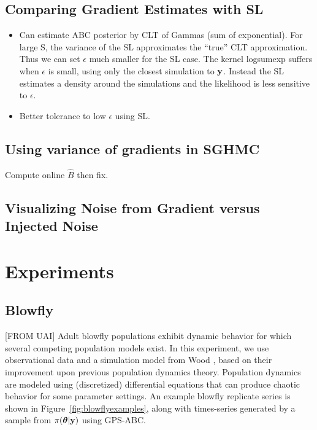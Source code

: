 \documentclass[]{article}
\begin{document}
\subsection{Comparing Gradient Estimates with SL}
\begin{itemize}
  \item Can estimate ABC posterior by CLT of Gammas (sum of exponential).  For large S, the variance of the SL approximates the ``true'' CLT approximation.  Thus we can set $\epsilon$ much smaller for the SL case.  The kernel logsumexp suffers when $\epsilon$ is small, using only the closest simulation to ${\bf y}$.  Instead the SL estimates a density around the simulations and the likelihood is less sensitive to $\epsilon$.
  \item Better tolerance to low $\epsilon$ using SL.
\end{itemize}

\subsection{Using variance of gradients in SGHMC}
Compute online $\hat{B}$ then fix.

\subsection{Visualizing Noise from Gradient versus Injected Noise}

\section{Experiments}\label{sec:experiments}

\subsection{Blowfly}\label{sec:bf}
[FROM UAI] Adult blowfly populations exhibit dynamic behavior for which several competing population models exist.  In this experiment, we use observational data and a simulation model from Wood \cite{wood2010statistical}, based on their improvement upon previous population dynamics theory.  Population dynamics are modeled using (discretized) differential equations that can produce chaotic behavior for some parameter settings.  An example blowfly replicate series is shown in Figure~\ref{fig:blowflyexamples}, along with  times-series generated by a sample from $\pi({\bm \theta}|{\bf y})$ using GPS-ABC.
 
\end{document}
